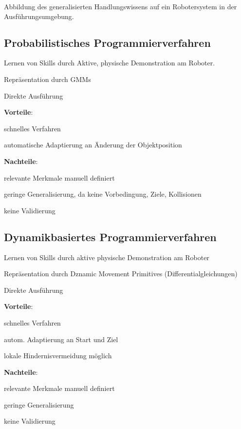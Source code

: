 Abbildung des generalisierten Handlungswissens auf ein Robotersystem in der Ausführungsumgebung.
\subsection{Probabilistisches Programmierverfahren}
\begin{compactitem}
    \item Lernen von Skills durch Aktive, physische Demonstration am Roboter.
    \item Repräsentation durch GMMs
    \item Direkte Ausführung
    \item \textbf{Vorteile}:
    \begin{compactitem}
        \item schnelles Verfahren
        \item automatische Adaptierung an Änderung der Objektposition
    \end{compactitem}
    \item \textbf{Nachteile}:
    \begin{compactitem}
        \item relevante Merkmale manuell definiert
        \item geringe Generalisierung, da keine Vorbedingung, Ziele, Kollisionen
        \item keine Validierung
    \end{compactitem}
\end{compactitem}

\subsection{Dynamikbasiertes Programmierverfahren}
\begin{compactitem}
    \item Lernen von Skills durch aktive physische Demonstration am Roboter
    \item Repräsentation durch Dznamic Movement Primitives (Differentialgleichungen)
    \item Direkte Ausführung
    \item \textbf{Vorteile}:
    \begin{compactitem}
        \item schnelles Verfahren
        \item autom. Adaptierung an Start und Ziel
        \item lokale Hindernisvermeidung möglich
    \end{compactitem}
    \item \textbf{Nachteile}:
    \begin{compactitem}
        \item relevante Merkmale manuell definiert
        \item geringe Generalisierung
        \item keine Validierung
    \end{compactitem}
\end{compactitem}
